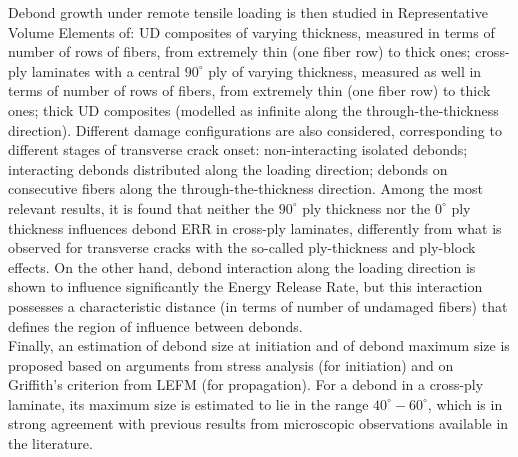 Debond growth under remote tensile loading is then studied in Representative Volume Elements of: UD composites of varying thickness, measured in terms of number of rows of fibers, from extremely thin (one fiber row) to thick ones; cross-ply laminates with a central $90^{\circ}$ ply of varying thickness, measured as well in terms of number of rows of fibers, from extremely thin (one fiber row) to thick ones; thick UD composites (modelled as infinite along the through-the-thickness direction). Different damage configurations are also considered, corresponding to different stages of transverse crack onset: non-interacting isolated debonds; interacting debonds distributed along the loading direction; debonds on consecutive fibers along the through-the-thickness direction. Among the most relevant results, it is found that neither the $90^{\circ}$ ply thickness nor the $0^{\circ}$ ply thickness influences debond ERR in cross-ply laminates, differently from what is observed for transverse cracks with the so-called ply-thickness and ply-block effects. On the other hand, debond interaction along the loading direction is shown to influence significantly the Energy Release Rate, but this interaction possesses a characteristic distance (in terms of number of undamaged fibers) that defines the region of influence between debonds.\\
Finally, an estimation of debond size at initiation and of debond maximum size is proposed based on arguments from stress analysis (for initiation) and on Griffith's criterion from LEFM (for propagation). For a debond in a cross-ply laminate, its maximum size is estimated to lie in the range $40^{\circ}-60^{\circ}$, which is in strong agreement with previous results from microscopic observations available in the literature.
